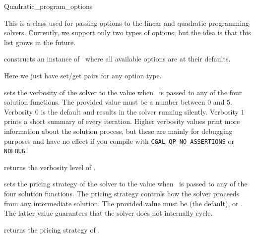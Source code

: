 \begin{ccRefClass}{Quadratic_program_options}


\ccDefinition
This is a class used for passing options to the linear and
quadratic programming solvers. Currently, we support only
two types of options, but the idea is that this list
grows in the future.

\ccCreation
\ccIndexClassCreation
{}

{constructs an instance of \ccRefName\ where all available options
are at their defaults.}

\ccOperations
Here we just have set/get pairs for any option type.


{sets the verbosity of the solver to the value  when
\ccVar\ is passed to any of the four solution functions. The provided
value must be a number between $0$ and $5$. Verbosity $0$ is the default and
results in the solver running silently. Verbosity $1$ prints a short
summary of every iteration. Higher verbosity values print more information
about the solution process, but these are mainly for debugging 
purposes and have no effect if you compile with 
\texttt{CGAL\_QP\_NO\_ASSERTIONS} or \texttt{NDEBUG}.}

{returns the verbosity level of \ccVar.}


{sets the pricing strategy of the solver to the value 
when \ccVar\ is passed to any of the four solution functions. The pricing
strategy controls how the solver proceeds from any intermediate solution.
The provided value must be  (the default), or 
. The latter value guarantees that the solver does
not internally cycle.}

{returns the pricing strategy of \ccVar.}

\ccExample
{}

\ccSeeAlso

\\
\\
\\
\end{ccRefClass}
